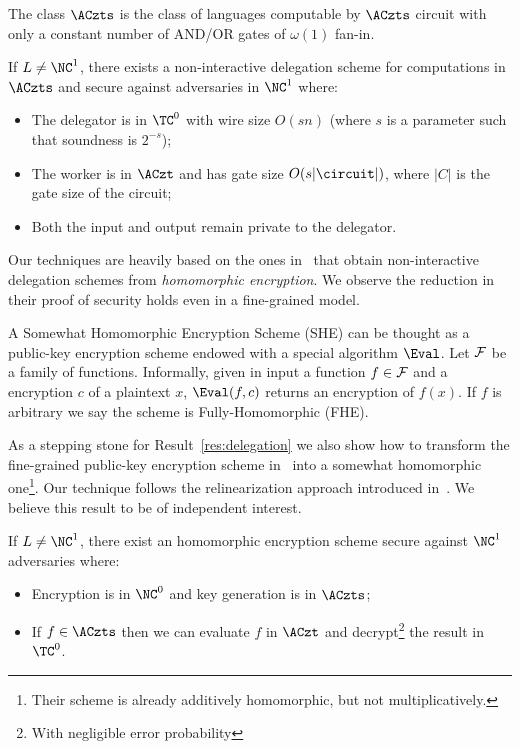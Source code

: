 {\begin{definition}
The class $\ACzts$ is the class of languages computable by $\ACzts$ circuit with only a constant number of AND/OR gates of $\omega(1)$ fan-in.
\end{definition}

\begin{result}
	\label{res:delegation}
	If $L \not = \NC^1$, there exists a non-interactive delegation scheme for computations in $\ACzts$ and secure against adversaries in $\NC^1$ where:
	\begin{itemize}
		\item The delegator is in $\TC^0$ with wire size $O(sn)$ (where $s$ is a parameter such that soundness  is $2^{-s}$);
		\item The worker is in $\ACzt$ and has gate size $O(s|\circuit|)$, where $|C|$ is the gate size of the circuit;
		\item Both the input and output remain private to the delegator.
	\end{itemize} 
\end{result}

Our techniques are heavily based on the ones in~\cite{ckv10} that obtain non-interactive delegation schemes from \textit{homomorphic encryption}. We observe the reduction in their proof of security holds even in a fine-grained model.

A Somewhat Homomorphic Encryption Scheme (SHE) can be thought as a public-key encryption scheme endowed with a special algorithm $\Eval$. Let $\cal{F}$ be a family of functions. Informally, given in input a function $f \in \cal{F}$ and a encryption $c$ of a plaintext $x$, $\Eval(f, c)$ returns an encryption of $f(x)$. If $f$ is arbitrary we say the scheme is Fully-Homomorphic (FHE).

As a stepping stone  for Result~\ref{res:delegation} we  also show how to transform the fine-grained public-key encryption scheme in~\cite{fgcrypto} into a somewhat homomorphic one\footnote{Their scheme is already additively homomorphic, but not multiplicatively.}. Our technique follows the relinearization approach introduced in~\cite{fhe-lwe}. We believe this result to be of independent interest.

\begin{result}
	If $L \not = \NC^1$, there exist an homomorphic encryption scheme secure against $\NC^1$ adversaries where:
	\begin{itemize}
		\item Encryption is in $\NC^0$ and key generation is in $\ACzts$;
		\item If $f \in \ACzts$ then we can evaluate $f$ in $\ACzt$ and decrypt\footnote{With negligible error probability} the result in $\TC^0$.
	\end{itemize}
\end{result}


}


